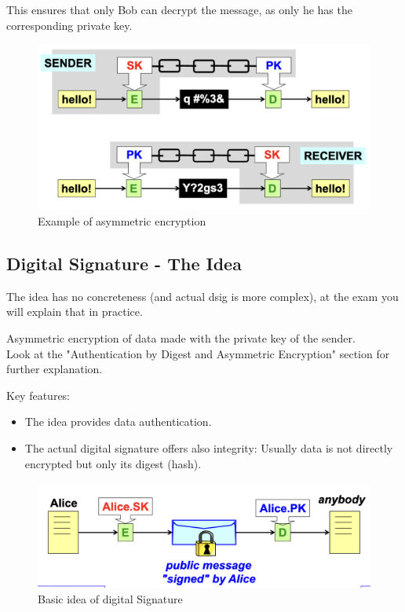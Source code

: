 This ensures that only Bob can decrypt the message, as only he has the corresponding private key.

\begin{figure}[H]
    \centering
    \includegraphics[width=0.5\linewidth]{Images/Cryptography/asymmCrypto.png}
    \caption{Example of asymmetric encryption}
\end{figure}


\subsection{Digital Signature - The Idea}
\begin{tcolorbox}[colback=red!10!white, colframe=red!70!black, coltitle=white, title=Beware]
The idea has no concreteness (and actual dsig is more complex), at the exam you will explain that in practice.
\end{tcolorbox}
\begin{center}
Asymmetric encryption of data made with the private key of the sender. \\ 
Look at the "Authentication by Digest and Asymmetric Encryption" section for further explanation.
\end{center}

Key features:
\begin{itemize}
    \item The idea provides data authentication.
    \item The actual digital signature offers also integrity: Usually data is not directly encrypted but only its digest (hash).
\end{itemize}


\begin{figure}[H]
    \centering
    \includegraphics[width=0.5\linewidth]{Images/Cryptography/basic_digital_signature.png}
    \caption{Basic idea of digital Signature}
\end{figure}

